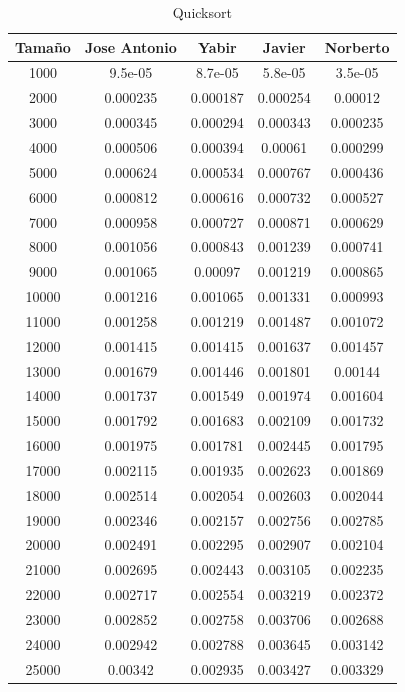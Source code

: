 \documentclass[11pt,a4paper]{article}
\begin{document}
\begin{table}[h]
	\centering
	\caption{Quicksort}
	\begin{tabular}{ | c | c  | c | c | c | }
		\hline
		Tama\~no & Jose Antonio & Yabir & Javier & Norberto\\
		\hline
		1000	&	9.5e-05	&	8.7e-05	&	5.8e-05	&	3.5e-05	\\
		2000	&	0.000235	&	0.000187	&	0.000254	&	0.00012	\\
		3000	&	0.000345	&	0.000294	&	0.000343	&	0.000235	\\
		4000	&	0.000506	&	0.000394	&	0.00061	&	0.000299	\\
		5000	&	0.000624	&	0.000534	&	0.000767	&	0.000436	\\
		6000	&	0.000812	&	0.000616	&	0.000732	&	0.000527	\\
		7000	&	0.000958	&	0.000727	&	0.000871	&	0.000629	\\
		8000	&	0.001056	&	0.000843	&	0.001239	&	0.000741	\\
		9000	&	0.001065	&	0.00097	&	0.001219	&	0.000865	\\
		10000	&	0.001216	&	0.001065	&	0.001331	&	0.000993	\\
		11000	&	0.001258	&	0.001219	&	0.001487	&	0.001072	\\
		12000	&	0.001415	&	0.001415	&	0.001637	&	0.001457	\\
		13000	&	0.001679	&	0.001446	&	0.001801	&	0.00144	\\
		14000	&	0.001737	&	0.001549	&	0.001974	&	0.001604	\\
		15000	&	0.001792	&	0.001683	&	0.002109	&	0.001732	\\
		16000	&	0.001975	&	0.001781	&	0.002445	&	0.001795	\\
		17000	&	0.002115	&	0.001935	&	0.002623	&	0.001869	\\
		18000	&	0.002514	&	0.002054	&	0.002603	&	0.002044	\\
		19000	&	0.002346	&	0.002157	&	0.002756	&	0.002785	\\
		20000	&	0.002491	&	0.002295	&	0.002907	&	0.002104	\\
		21000	&	0.002695	&	0.002443	&	0.003105	&	0.002235	\\
		22000	&	0.002717	&	0.002554	&	0.003219	&	0.002372	\\
		23000	&	0.002852	&	0.002758	&	0.003706	&	0.002688	\\
		24000	&	0.002942	&	0.002788	&	0.003645	&	0.003142	\\
		25000	&	0.00342	&	0.002935	&	0.003427	&	0.003329	\\
		\hline
	\end{tabular}
\end{table}
\end{document}
